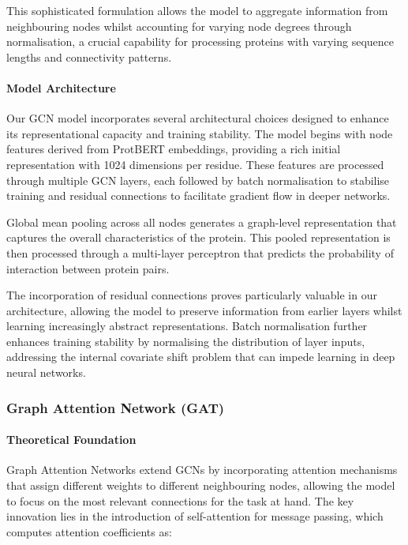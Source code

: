\documentclass[12pt,a4paper]{article}
\begin{document}
This sophisticated formulation allows the model to aggregate information from neighbouring nodes whilst accounting for varying node degrees through normalisation, a crucial capability for processing proteins with varying sequence lengths and connectivity patterns.

\paragraph{Model Architecture}

Our GCN model incorporates several architectural choices designed to enhance its representational capacity and training stability. The model begins with node features derived from ProtBERT embeddings, providing a rich initial representation with 1024 dimensions per residue. These features are processed through multiple GCN layers, each followed by batch normalisation to stabilise training and residual connections to facilitate gradient flow in deeper networks.

Global mean pooling across all nodes generates a graph-level representation that captures the overall characteristics of the protein. This pooled representation is then processed through a multi-layer perceptron that predicts the probability of interaction between protein pairs.

The incorporation of residual connections proves particularly valuable in our architecture, allowing the model to preserve information from earlier layers whilst learning increasingly abstract representations. Batch normalisation further enhances training stability by normalising the distribution of layer inputs, addressing the internal covariate shift problem that can impede learning in deep neural networks.

\subsubsection{Graph Attention Network (GAT)}

\paragraph{Theoretical Foundation}

Graph Attention Networks extend GCNs by incorporating attention mechanisms that assign different weights to different neighbouring nodes, allowing the model to focus on the most relevant connections for the task at hand. The key innovation lies in the introduction of self-attention for message passing, which computes attention coefficients as:
\end{document}
